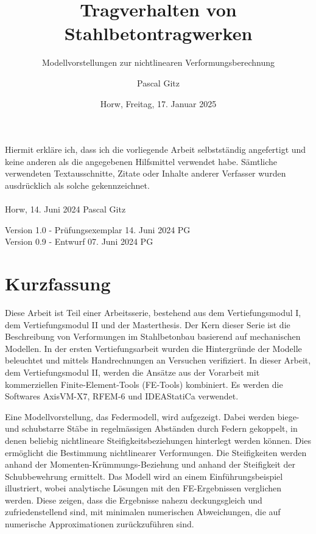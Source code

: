 \documentclass[
  11pt,
  letterpaper,
]{scrreprt}
\title{Tragverhalten von Stahlbetontragwerken}
\subtitle
{Modellvorstellungen zur nichtlinearen Verformungsberechnung}
\date{\large Horw, Freitag, 17. Januar 2025}
\author{Pascal Gitz}
\begin{document}
\maketitle


Hiermit erkläre ich, dass ich die vorliegende Arbeit selbstständig angefertigt und keine anderen als die angegebenen Hilfsmittel verwendet habe. Sämtliche verwendeten Textausschnitte, Zitate oder Inhalte anderer Verfasser wurden ausdrücklich als solche gekennzeichnet.\\%
%
\\%
%
Horw, 14. Juni 2024 \hfill Pascal Gitz%

\vfill

Version 1.0 - Prüfungsexemplar \hfill 14. Juni 2024 \quad \quad \quad \quad \quad PG\\
Version 0.9 - Entwurf \hfill 07. Juni 2024 \quad \quad \quad \quad \quad PG\\

\newpage

\chapter*{Kurzfassung}

Diese Arbeit ist Teil einer Arbeitsserie, bestehend aus dem Vertiefungsmodul I, dem Vertiefungsmodul II und der Masterthesis. Der Kern dieser Serie ist die Beschreibung von Verformungen im Stahlbetonbau basierend auf mechanischen Modellen. In der ersten Vertiefungsarbeit wurden die Hintergründe der Modelle beleuchtet und mittels Handrechnungen an Versuchen verifiziert. In dieser Arbeit, dem Vertiefungsmodul II, werden die Ansätze aus der Vorarbeit mit kommerziellen Finite-Element-Tools (FE-Tools) kombiniert. Es werden die Softwares AxisVM-X7, RFEM-6 und IDEAStatiCa verwendet.

Eine Modellvorstellung, das Federmodell, wird aufgezeigt. Dabei werden biege- und schubstarre Stäbe in regelmässigen Abständen durch Federn gekoppelt, in denen beliebig nichtlineare Steifigkeitsbeziehungen hinterlegt werden können. Dies ermöglicht die Bestimmung nichtlinearer Verformungen. Die Steifigkeiten werden anhand der Momenten-Krümmungs-Beziehung und anhand der Steifigkeit der Schubbewehrung ermittelt. Das Modell wird an einem Einführungsbeispiel illustriert, wobei analytische Lösungen mit den FE-Ergebnissen verglichen werden. Diese zeigen, dass die Ergebnisse nahezu deckungsgleich und zufriedenstellend sind, mit minimalen numerischen Abweichungen, die auf numerische Approximationen zurückzuführen sind.
\end{document}
